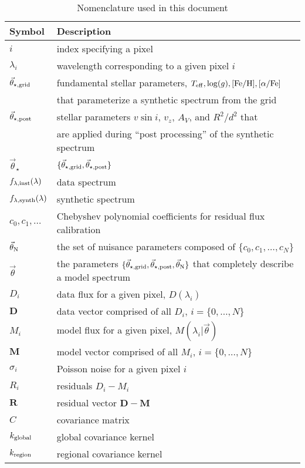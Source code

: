 \documentclass[preprint]{aastex} %
\newcommand{\vt}{\vec{\theta}}
\newcommand{\vg}{\vt_{\star, {\rm grid}}}
\newcommand{\vpp}{\vt_{\star, {\rm post}}}
\newcommand{\vstar}{\vt_{\star}}
\newcommand{\finst}{f_{\lambda, {\rm inst}}}
\newcommand{\fsynth}{f_{\lambda, {\rm synth}}}
\newcommand{\vN}{\vt_{\rm N}}
\newcommand{\fM}{ {\bm M}}
\newcommand{\fMi}{M_i}
\newcommand{\fD}{ {\bm D}}
\newcommand{\fDi}{D_i}
\newcommand{\fR}{ {\bm R}}
\newcommand{\Z}{[{\rm Fe}/{\rm H}]}
\newcommand{\A}{[\alpha/{\rm Fe}]}
\begin{document}
\begin{table}[!htb]
\begin{tabular}{ll}
\hline
\hline
Symbol & Description\\
\hline
\hline
$i$ & index specifying a pixel\\
$\lambda_i$ & wavelength corresponding to a given pixel $i$\\
$\vg$ & fundamental stellar parameters, $T_{\rm eff}, \log(g), \Z, \A$\\
  & that parameterize a synthetic spectrum from the grid\\
$\vpp$ & stellar parameters $v \sin i$, $v_z$, $A_V$, and $R^2/d^2$ that\\
  & are applied during ``post processing'' of the synthetic spectrum\\
$\vstar$ & $\{\vg,\vpp \}$\\
$\finst(\lambda)$ & data spectrum\\
$\fsynth(\lambda)$ & synthetic spectrum\\
$c_0, c_1, \ldots$ & Chebyshev polynomial coefficients for residual flux calibration\\
$\vN$ & the set of nuisance parameters composed of $\{c_0, c_1, \ldots, c_N\}$\\
$\vt$ & the parameters $\{\vg, \vpp, \vN\}$ that completely describe a model spectrum\\
$\fDi$ & data flux for a given pixel, $D(\lambda_i)$\\
$\fD$ & data vector comprised of all $\fDi$, $i = \{0, \ldots, N\}$\\
$\fMi$ & model flux for a given pixel, $M(\lambda_i | \vt)$\\
$\fM$ & model vector comprised of all $\fMi$, $i = \{0, \ldots, N\}$\\
$\sigma_i$ & Poisson noise for a given pixel $i$\\
$R_i$ & residuals $\fDi - \fMi$\\
$\fR$ & residual vector $\fD - \fM$\\
$C$ & covariance matrix\\
$k_{\rm global}$  & global covariance kernel\\
$k_{\rm region}$  & regional covariance kernel\\
\hline
\end{tabular}
\caption{Nomenclature used in this document}
\label{tab:nomenclature}
\end{table}
\end{document}
